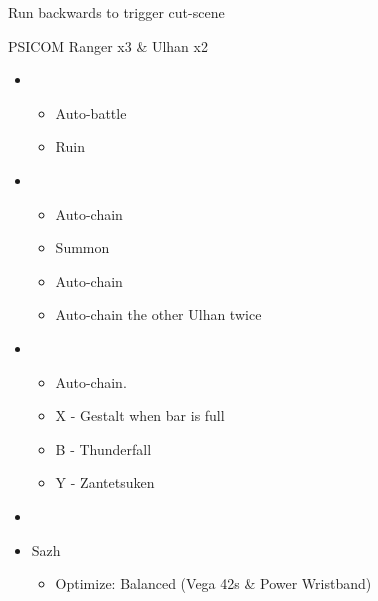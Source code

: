\newpage
\begin{multicols}{2}
Run backwards to trigger cut-scene

\begin{battle}{PSICOM Ranger x3 \& Ulhan x2}
\begin{itemize}
    \item \second
    \begin{itemize}
        \item Auto-battle
        \item Ruin
    \end{itemize}
    \item \fourth
    \begin{itemize}
        \item Auto-chain
        \item Summon
        \item Auto-chain
    \end{itemize}
    \begin{itemize}
        \item Auto-chain the other Ulhan twice
    \end{itemize}
    \item \fourth
    \begin{itemize}
        \item Auto-chain.
		\item X - Gestalt when bar is full
		\item B - Thunderfall
		\item Y - Zantetsuken
    \end{itemize}
\end{itemize}
 
\end{battle}


\begin{menu}
\begin{itemize}
    \paradigm
    \begin{itemize}
        \item {}%
{\paradigmline{\com}{\rav}{}}%
{\paradigmline[2]{\textit{\syn}}{\textit{\sab}}{}}%
{\paradigmline{\com}{(\sab)}{}}%
{\paradigmline{\rav}{\rav}{}}%
{\paradigmline{[\rav]}{(\sab)}{}}%
{\paradigmline{[\com]}{\rav}{}}
    \end{itemize}
    \equip
    \begin{itemize}
        \item Sazh
        \begin{itemize}
            \item Optimize: Balanced (Vega 42s \& Power Wristband)
        \end{itemize}
    \end{itemize}
\end{itemize}
\end{menu}


\end{multicols}
